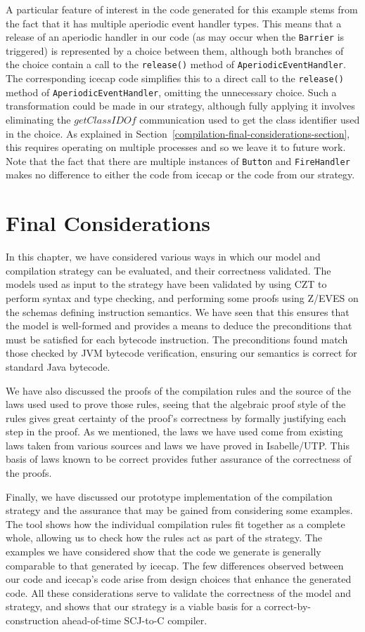 A particular feature of interest in the code generated for this
example stems from the fact that it has multiple aperiodic event
handler types.
This means that a release of an aperiodic handler in our code (as may
occur when the \texttt{Barrier} is triggered) is represented by a
choice between them, although both branches of the choice contain a
call to the \texttt{release()} method of
\texttt{AperiodicEventHandler}.
The corresponding icecap code simplifies this to a direct call to the
\texttt{release()} method of \texttt{AperiodicEventHandler}, omitting
the unnecessary choice.
Such a transformation could be made in our strategy, although fully
applying it involves eliminating the $getClassIDOf$ communication used
to get the class identifier used in the choice.
As explained in
Section~\ref{compilation-final-considerations-section}, this requires
operating on multiple processes and so we leave it to future work.
Note that the fact that there are multiple instances of
\texttt{Button} and \texttt{FireHandler} makes no difference to either
the code from icecap or the code from our strategy.

\section{Final Considerations}
\label{evaluation-final-considerations-section}

In this chapter, we have considered various ways in which our model
and compilation strategy can be evaluated, and their correctness
validated.
The models used as input to the strategy have been validated by using
CZT to perform syntax and type checking, and performing some proofs
using Z/EVES on the schemas defining instruction semantics.
We have seen that this ensures that the model is well-formed and
provides a means to deduce the preconditions that must be satisfied
for each bytecode instruction.
The preconditions found match those checked by JVM bytecode
verification, ensuring our semantics is correct for standard Java
bytecode.

We have also discussed the proofs of the compilation rules and the
source of the laws used used to prove those rules, seeing that the
algebraic proof style of the rules gives great certainty of the
proof's correctness by formally justifying each step in the proof.
As we mentioned, the laws we have used come from existing \Circus{}
laws taken from various sources and laws we have proved in
Isabelle/UTP.
This basis of laws known to be correct provides futher assurance of
the correctness of the proofs.

Finally, we have discussed our prototype implementation of the
compilation strategy and the assurance that may be gained from
considering some examples.
The tool shows how the individual compilation rules fit together as a
complete whole, allowing us to check how the rules act as part of the
strategy.
The examples we have considered show that the code we generate is
generally comparable to that generated by icecap.
The few differences observed between our code and icecap's code arise
from design choices that enhance the generated code.
All these considerations serve to validate the correctness of the
model and strategy, and shows that our strategy is a viable basis for
a correct-by-construction ahead-of-time SCJ-to-C compiler.
